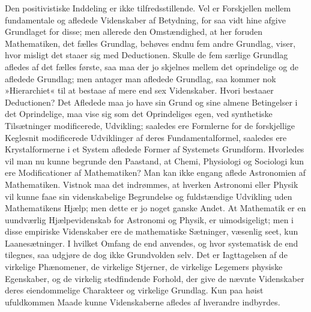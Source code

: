 \documentclass[12pt]{book}
\newcommand{\apage}[1]{\marginnote{\footnotesize\textit{[#1]}}}
\begin{document}
Den positivistiske Inddeling er ikke tilfredsstillende. Vel er Forskjellen
mellem fundamentale og afledede Videnskaber af Betydning, for saa vidt
hine afgive Grundlaget for disse; men allerede den Omstændighed, \apage{93} at her
foruden Mathematiken, det fælles Grundlag, behøves endnu fem andre
Grundlag, viser, hvor misligt det staaer sig med Deductionen. Skulle de fem
særlige Grundlag afledes af det fælles første, saa maa der jo skjelnes
mellem det oprindelige og de afledede Grundlag; men antager man afledede
Grundlag, saa kommer nok »Hierarchiet« til at bestaae af mere end sex
Videnskaber. Hvori bestaaer Deductionen? Det Afledede maa jo have sin Grund
og sine almene Betingelser i det Oprindelige, maa vise sig som det
Oprindeliges egen, ved synthetiske Tilsætninger modificerede, Udvikling;
saaledes ere Formlerne for de forskjellige Keglesnit modificerede
Udviklinger af deres Fundamentalformel, saaledes ere Krystalformerne i et
System afledede Former af Systemets Grundform. Hvorledes vil man nu kunne
begrunde den Paastand, at Chemi, Physiologi og Sociologi kun ere
Modificationer af Mathematiken? Man kan ikke engang aflede Astronomien af
Mathematiken. Vistnok maa det indrømmes, at hverken Astronomi eller Physik
vil kunne faae sin videnskabelige Begrundelse og fuldstændige Udvikling
uden Mathematikens Hjælp; men dette er jo noget ganske Andet. At Mathematik
er en uundværlig Hjælpevidenskab for Astronomi og Physik, er uimodsigeligt;
men i disse empiriske Videnskaber ere de mathematiske Sætninger, væsenlig
seet, kun Laanesætninger. I hvilket Omfang de end anvendes, og hvor
systematisk de end tilegnes, saa udgjøre de dog ikke Grundvolden selv. Det
er Iagttagelsen af de virkelige Phænomener, de virkelige Stjerner, de  \apage{94}
virkelige Legemers physiske Egenskaber, og de virkelig stedfindende
Forhold, der give de nævnte Videnskaber deres eiendommelige Charakteer og
virkelige Grundlag. Kun paa høist ufuldkommen Maade kunne Videnskaberne
afledes af hverandre indbyrdes.
\end{document}

